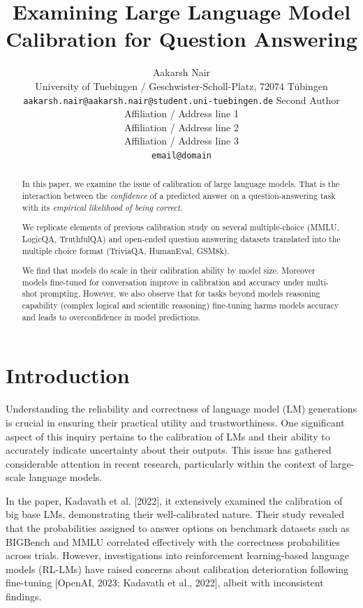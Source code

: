 \documentclass[11pt]{article}
\title{Examining Large Language Model Calibration for Question Answering}
\author{Aakarsh Nair\\
  University of Tuebingen / Geschwister-Scholl-Platz, 72074 Tübingen\\
  \texttt{aakarsh.nair@aakarsh.nair@student.uni-tuebingen.de} 
  Second Author \\
  Affiliation / Address line 1 \\
  Affiliation / Address line 2 \\
  Affiliation / Address line 3 \\
  \texttt{email@domain} \\}
\begin{document}
\maketitle

\begin{abstract}
In this paper, we examine the issue of calibration of large language models. 
That is the interaction between the \emph{confidence} of a predicted answer 
on a question-answering task with its \emph{empirical likelihood 
of being correct}.

We replicate elements of previous calibration study \cite{kadavath2022language} 
on several multiple-choice  (MMLU, LogicQA, TruthfulQA) and 
open-ended question answering datasets translated into 
the multiple choice format (TriviaQA, HumanEval, GSM8k). 

We find that models do scale in their calibration ability by model size. 
Moreover models fine-tuned for conversation improve in calibration and 
accuracy under multi-shot prompting. However, we also observe that for tasks beyond 
models reasoning  capability (complex logical and scientific reasoning) fine-tuning harms models 
accuracy and leads to overconfidence in model predictions.

\end{abstract}


\section{Introduction}

Understanding the reliability and correctness of language model (LM) generations is crucial in ensuring their practical utility and trustworthiness. One significant aspect of this inquiry pertains to the calibration of LMs and their ability to accurately indicate uncertainty about their outputs. This issue has gathered considerable attention in recent research, particularly within the context of large-scale language models.

In the paper, Kadavath et al. [2022], it extensively examined the calibration of big base LMs, demonstrating their well-calibrated nature. Their study revealed that the probabilities assigned to answer options on benchmark datasets such as BIGBench and MMLU correlated effectively with the correctness probabilities across trials. However, investigations into reinforcement learning-based language models (RL-LMs) have raised concerns about calibration deterioration following fine-tuning [OpenAI, 2023; Kadavath et al., 2022], albeit with inconsistent findings.
\end{document}

